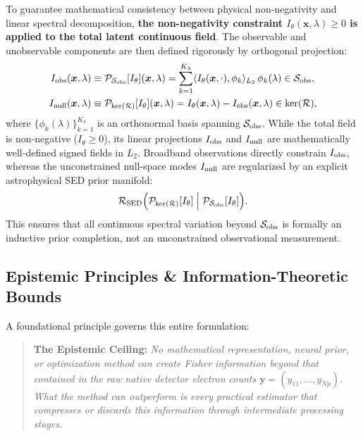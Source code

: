 \documentclass[11pt,a4paper]{article}
\begin{document}
To guarantee mathematical consistency between physical non-negativity and linear spectral decomposition, \textbf{the non-negativity constraint $I_\theta(\boldsymbol{x}, \lambda) \ge 0$ is applied to the total latent continuous field}. The observable and unobservable components are then defined rigorously by orthogonal projection:
\begin{align}
I_{\rm obs}(\boldsymbol{x}, \lambda) &\equiv \mathcal{P}_{\mathcal{S}_{\rm obs}}[I_\theta](\boldsymbol{x}, \lambda) = \sum_{k=1}^{K_\lambda} \langle I_\theta(\boldsymbol{x}, \cdot), \phi_k \rangle_{L_2} \, \phi_k(\lambda) \in \mathcal{S}_{\rm obs}, \\
I_{\rm null}(\boldsymbol{x}, \lambda) &\equiv \mathcal{P}_{\ker(\mathcal{R})}[I_\theta](\boldsymbol{x}, \lambda) = I_\theta(\boldsymbol{x}, \lambda) - I_{\rm obs}(\boldsymbol{x}, \lambda) \in \ker(\mathcal{R}),
\label{eq:spectral_decomp}
\end{align}
where $\{\phi_k(\lambda)\}_{k=1}^{K_\lambda}$ is an orthonormal basis spanning $\mathcal{S}_{\rm obs}$. While the total field is non-negative ($I_\theta \ge 0$), its linear projections $I_{\rm obs}$ and $I_{\rm null}$ are mathematically well-defined signed fields in $L_2$. Broadband observations directly constrain $I_{\rm obs}$, whereas the unconstrained null-space modes $I_{\rm null}$ are regularized by an explicit astrophysical SED prior manifold:
\begin{equation}
\mathcal{R}_{\rm SED}\Big( \mathcal{P}_{\ker(\mathcal{R})}[I_\theta] \;\Big|\; \mathcal{P}_{\mathcal{S}_{\rm obs}}[I_\theta] \Big).
\end{equation}
This ensures that all continuous spectral variation beyond $\mathcal{S}_{\rm obs}$ is formally an inductive prior completion, not an unconstrained observational measurement.

\subsection{Epistemic Principles \& Information-Theoretic Bounds}
A foundational principle governs this entire formulation:
\begin{quote}
\textbf{The Epistemic Ceiling:} \emph{No mathematical representation, neural prior, or optimization method can create Fisher information beyond that contained in the raw native detector electron counts $\boldsymbol{y} = (y_{11}, \dots, y_{Np})$. What the method can outperform is every practical estimator that compresses or discards this information through intermediate processing stages.}
\end{quote}
\end{document}
